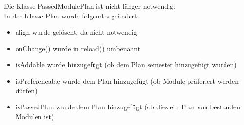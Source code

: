 Die Klasse PassedModulePlan ist nicht länger notwendig.\\
In der Klasse Plan wurde folgendes geändert:
\begin{itemize}
	\item align wurde gelöscht, da nicht notwendig
	\item onChange() wurde in reload() umbenannt
	\item isAddable wurde hinzugefügt (ob dem Plan semester hinzugefügt wurden)
	\item isPreferencable wurde dem Plan hinzugefügt (ob Module präferiert werden dürfen)
	\item isPassedPlan wurde dem Plan hinzugefügt (ob dies ein Plan von bestanden Modulen ist)
\end{itemize}